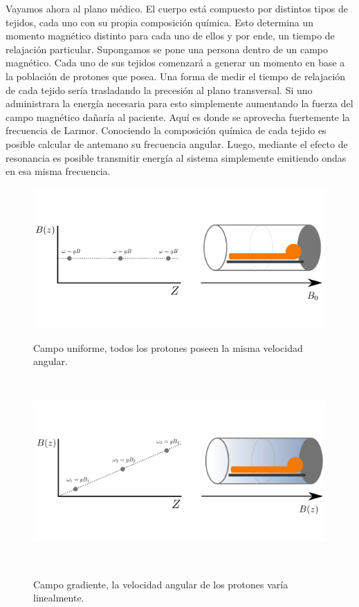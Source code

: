 Vayamos ahora al plano m\'edico. El cuerpo est\'a compuesto por distintos 
tipos de tejidos, cada uno con su propia composici\'on qu\'imica. Esto 
determina un momento magn\'etico distinto para cada uno de ellos y por
ende, un tiempo de relajaci\'on particular. Supongamos se pone una persona
dentro de un campo magn\'etico. Cada uno de sus tejidos comenzar\'a a 
generar un momento en base a la poblaci\'on de protones que posea. 
Una forma de medir el tiempo de relajaci\'on de cada tejido ser\'ia
trasladando la precesi\'on al plano transversal. Si uno administrara 
la energ\'ia necesaria para esto simplemente aumentando la fuerza del
campo magn\'etico
da\~nar\'ia al paciente. Aqu\'i es donde se aprovecha fuertemente la
frecuencia de Larmor. Conociendo la composici\'on qu\'imica de cada tejido
es posible calcular de antemano su frecuencia angular. Luego, mediante el
efecto de resonancia es posible transmitir energ\'ia al sistema
simplemente emitiendo ondas en esa misma frecuencia. \\

\begin{figure}[h!]
                                                                                                                        
\begin{minipage}[b]{0.49\textwidth}
    \includegraphics[width=\textwidth]{1.background/dmri/img/grad0.png}
    \caption{\small  Campo uniforme, todos los protones poseen la misma velocidad angular.}
     \label{fig:unif}
\end{minipage} ~
\hfill
\begin{minipage}[b]{0.49\textwidth}
    \includegraphics[width=\textwidth]{1.background/dmri/img/grad1.png}
    \caption{\small Campo gradiente, la velocidad angular de los protones var\'ia linealmente. }
    \label{fig:grad}
\end{minipage} ~

\end{figure}  


